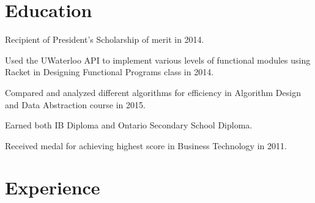 \documentclass[letterpaper]{deedy-resume}
\begin{document}
\begin{minipage}[t]{0.66\textwidth} 


\section{Education}


\vspace{\topsep} 
\begin{tightitemize}
\item Recipient of President's Scholarship of merit in 2014.
\item Used the UWaterloo API to implement various levels of functional modules using Racket in Designing Functional Programs class in 2014.
\item Compared and analyzed different algorithms for efficiency in Algorithm Design and Data Abstraction course in 2015.
\end{tightitemize}

\sectionspace 



\begin{tightitemize}
\item Earned both IB Diploma and Ontario Secondary School Diploma.
\item Received medal for achieving highest score in Business Technology in 2011.
\end{tightitemize}

\sectionspace 


\section{Experience}



\end{minipage}
\end{document}
